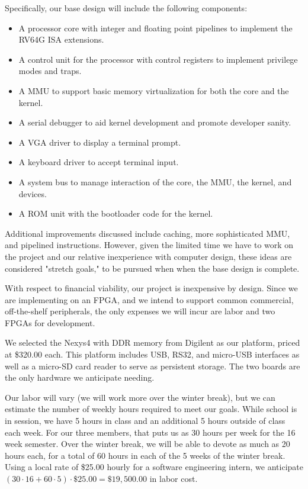 \documentclass{article}
\begin{document}
Specifically, our base design will include the following components:
\begin{itemize}
    \item A processor core with integer and floating point pipelines to implement the RV64G ISA extensions.
    \item A control unit for the processor with control registers to implement privilege modes and traps.
    \item A MMU to support basic memory virtualization for both the core and the kernel.
    \item A serial debugger to aid kernel development and promote developer sanity.
    \item A VGA driver to display a terminal prompt.
    \item A keyboard driver to accept terminal input.
    \item A system bus to manage interaction of the core, the MMU, the kernel, and devices.
    \item A ROM unit with the bootloader code for the kernel.
\end{itemize}

Additional improvements discussed include caching, more sophisticated MMU, and pipelined instructions.  However, given the limited time we have to work on the project and our relative inexperience with computer design, these ideas are considered "stretch goals," to be pursued when when the base design is complete.

With respect to financial viability, our project is inexpensive by design.  Since we are implementing on an FPGA, and we intend to support common commercial, off-the-shelf peripherals, the only expenses we will incur are labor and two FPGAs for development.  

We selected the Nexys4 with DDR memory from Digilent as our platform, priced at \$320.00 each.  This platform includes USB, RS32, and micro-USB interfaces as well as a micro-SD card reader to serve as persistent storage.  The two boards are the only hardware we anticipate needing.

Our labor will vary (we will work more over the winter break), but we can estimate the number of weekly hours required to meet our goals.  While school is in session, we have 5 hours in class and an additional 5 hours outside of class each week.  For our three members, that puts us as 30 hours per week for the 16 week semester.  Over the winter break, we will be able to devote as much as 20 hours each, for a total of 60 hours in each of the 5 weeks of the winter break.  Using a local rate of \$25.00 hourly for a software engineering intern, we anticipate $(30\cdot 16 + 60\cdot 5)\cdot \$25.00 = \$19,500.00$ in labor cost.
\end{document}
